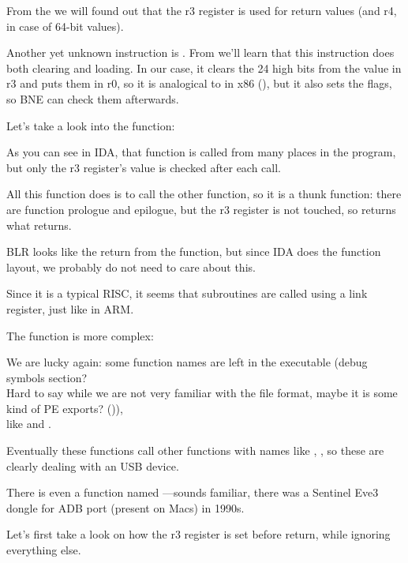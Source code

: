 From the \PPCABI we will found out that the r3 register is used for return values (and r4, in case of 64-bit values).

Another yet unknown instruction is . 
From \PPC we'll learn that this instruction does both clearing and loading. 
In our case, it clears the 24 high bits from the value in r3
and puts them in r0, so it is analogical to \MOVZX in x86 (),
but it also sets the flags, so \ac{BNE} 
can check them afterwards.

Let's take a look into the  function:



As you can see in \ac{IDA}, that function is called from many places in the program, but only the r3 register's value
is checked after each call.

All this function does is to call the other function, so it is a \gls{thunk function}: 
there are function prologue and epilogue, but the r3 register is not touched, so  
returns what  returns.

\ac{BLR} looks like the return from the function, but since \ac{IDA} does the function layout, we probably do not need
to care about this.

Since it is a typical \ac{RISC}, it seems that subroutines are called using a \gls{link register},
just like in ARM.

The  function is more complex:




We are lucky again: some function names are left in the executable 
(debug symbols section? \\
Hard to say while we are not very familiar with the file format, maybe it is
some kind of PE exports? ()),\\
like  and .

Eventually these functions call other functions with names like , 
,
so these are clearly dealing with an USB device.

There is even a function named 
---sounds familiar, there was a Sentinel Eve3 
dongle for ADB port (present on Macs) in 1990s.

Let's first take a look on how the r3 register is set before return, while ignoring everything else.

